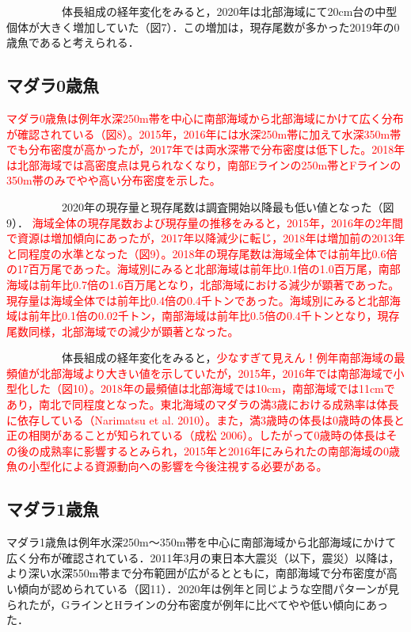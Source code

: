 \documentclass[11pt]{article} %
\begin{document}
\begin{linenumbers}
\ \ \ \ \ \ \ \ \ \ 
体長組成の経年変化をみると，2020年は北部海域にて20cm台の中型個体が大きく増加していた（図7）．この増加は，現存尾数が多かった2019年の0歳魚であると考えられる．

\subsection{マダラ0歳魚}
\textcolor{red}{マダラ0歳魚は例年水深250m帯を中心に南部海域から北部海域にかけて広く分布が確認されている（図8）。2015年，2016年には水深250m帯に加えて水深350m帯でも分布密度が高かったが，2017年では両水深帯で分布密度は低下した。2018年は北部海域では高密度点は見られなくなり，南部Eラインの250m帯とFラインの350m帯のみでやや高い分布密度を示した。}

\ \ \ \ \ \ \ \ \ \ 
2020年の現存量と現存尾数は調査開始以降最も低い値となった（図9）．\textcolor{red}{
海域全体の現存尾数および現存量の推移をみると，2015年，2016年の2年間で資源は増加傾向にあったが，2017年以降減少に転じ，2018年は増加前の2013年と同程度の水準となった（図9）。2018年の現存尾数は海域全体では前年比0.6倍の17百万尾であった。海域別にみると北部海域は前年比0.1倍の1.0百万尾，南部海域は前年比0.7倍の1.6百万尾となり，北部海域における減少が顕著であった。現存量は海域全体では前年比0.4倍の0.4千トンであった。海域別にみると北部海域は前年比0.1倍の0.02千トン，南部海域は前年比0.5倍の0.4千トンとなり，現存尾数同様，北部海域での減少が顕著となった。}

\ \ \ \ \ \ \ \ \ \ 
体長組成の経年変化をみると，\textcolor{red}{少なすぎて見えん！例年南部海域の最頻値が北部海域より大きい値を示していたが，2015年，2016年では南部海域で小型化した（図10）。2018年の最頻値は北部海域では10cm，南部海域では11cmであり，南北で同程度となった。東北海域のマダラの満3歳における成熟率は体長に依存している（Narimatsu et al. 2010）。また，満3歳時の体長は0歳時の体長と正の相関があることが知られている（成松 2006）。したがって0歳時の体長はその後の成熟率に影響するとみられ，2015年と2016年にみられたの南部海域の0歳魚の小型化による資源動向への影響を今後注視する必要がある。}

\subsection{マダラ1歳魚}
マダラ1歳魚は例年水深250m～350m帯を中心に南部海域から北部海域にかけて広く分布が確認されている．2011年3月の東日本大震災（以下，震災）以降は，より深い水深550m帯まで分布範囲が広がるとともに，南部海域で分布密度が高い傾向が認められている（図11）．2020年は例年と同じような空間パターンが見られたが，GラインとHラインの分布密度が例年に比べてやや低い傾向にあった．


\end{linenumbers}
\end{document}
